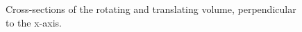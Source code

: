 \begin{figure}[htbp]
    \caption{Cross-sections of the rotating and translating volume, perpendicular to the x-axis.}
    \label{fig:cross_section_0rt}
  \end{figure}
  
